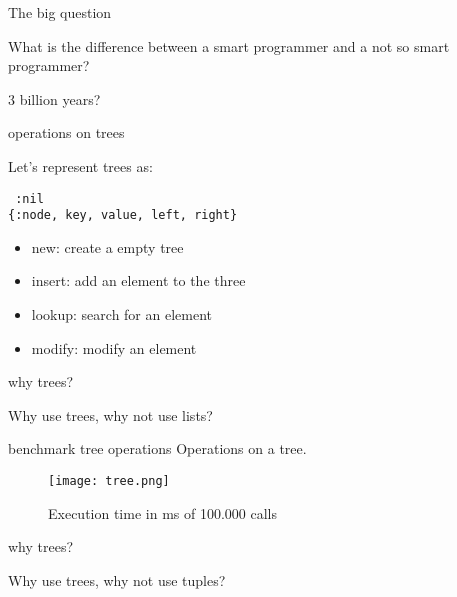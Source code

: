 \begin{frame}{The big question}

What is the difference between a smart programmer and a not so smart programmer?

\vspace{60pt}
\pause \centerline{3 billion years?}

\end{frame}

\begin{frame}[fragile]{operations on trees}

  Let's represent trees as:
  \vspace{10pt}
  
\begin{verbatim}
 :nil
{:node, key, value, left, right}
\end{verbatim}

\pause \vspace{20pt}
\begin{itemize}
\item new: create a empty tree
\item insert: add an element to the three
\item lookup: search for an element 
\item modify: modify an element
\end{itemize}

\end{frame}

\begin{frame}{why trees?}

Why use trees, why not use lists?

\end{frame}

\begin{frame}{benchmark tree operations}
 Operations on a tree.
 \begin{figure}
  \centering
  \texttt{[image: tree.png]}
  \caption{Execution time in ms of 100.000 calls}
 \end{figure}

\end{frame}

\begin{frame}{why trees?}

\pause \vspace{40pt}
Why use trees, why not use tuples?

\end{frame}

